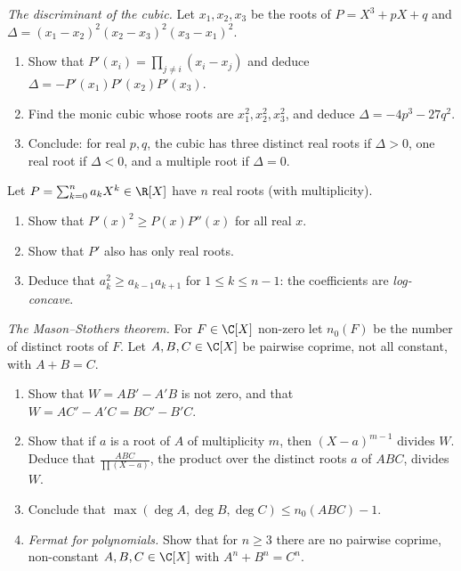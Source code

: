 \begin{exercise}[$\star\star\star$]\label{ex:disc}
\emph{The discriminant of the cubic.} Let $x_1,x_2,x_3$ be the roots of $P=X^3+pX+q$ and $\Delta=(x_1-x_2)^2(x_2-x_3)^2(x_3-x_1)^2$.
\begin{enumerate}[label=(\alph*)]
\item Show that $P'(x_i)=\prod_{j\ne i}(x_i-x_j)$ and deduce $\Delta=-P'(x_1)P'(x_2)P'(x_3)$.
\item Find the monic cubic whose roots are $x_1^2,x_2^2,x_3^2$, and deduce $\Delta=-4p^3-27q^2$.
\item Conclude: for real $p,q$, the cubic has three distinct real roots if $\Delta>0$, one real root if $\Delta<0$, and a multiple root if $\Delta=0$.
\end{enumerate}
\end{exercise}

\begin{exercise}[$\star\star\star$]\label{ex:logconcave}
Let $P=\sum_{k=0}^na_kX^k\in\R[X]$ have $n$ real roots (with multiplicity).
\begin{enumerate}[label=(\alph*)]
\item Show that $P'(x)^2\ge P(x)P''(x)$ for all real $x$.
\item Show that $P'$ also has only real roots.
\item Deduce that $a_k^2\ge a_{k-1}a_{k+1}$ for $1\le k\le n-1$: the coefficients are \emph{log-concave}.
\end{enumerate}
\end{exercise}

\begin{exercise}[$\star\star\star$]\label{ex:mason}
\emph{The Mason--Stothers theorem.} For $F\in\C[X]$ non-zero let $n_0(F)$ be the number of distinct roots of $F$. Let $A,B,C\in\C[X]$ be
pairwise coprime, not all constant, with $A+B=C$.
\begin{enumerate}[label=(\alph*)]
\item Show that $W=AB'-A'B$ is not zero, and that $W=AC'-A'C=BC'-B'C$.
\item Show that if $a$ is a root of $A$ of multiplicity $m$, then $(X-a)^{m-1}$ divides $W$. Deduce that $\frac{ABC}{\prod(X-a)}$, the product over
the distinct roots $a$ of $ABC$, divides $W$.
\item Conclude that $\max(\deg A,\deg B,\deg C)\le n_0(ABC)-1$.
\item \emph{Fermat for polynomials.} Show that for $n\ge3$ there are no pairwise coprime, non-constant $A,B,C\in\C[X]$ with $A^n+B^n=C^n$.
\end{enumerate}
\end{exercise}

